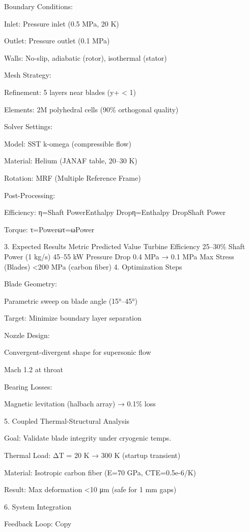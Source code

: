 \documentclass{article}
\begin{document}
Boundary Conditions:

Inlet: Pressure inlet (0.5 MPa, 20 K)

Outlet: Pressure outlet (0.1 MPa)

Walls: No-slip, adiabatic (rotor), isothermal (stator)

Mesh Strategy:

Refinement: 5 layers near blades (y+ \textless{} 1)

Elements: 2M polyhedral cells (90\% orthogonal quality)

Solver Settings:

Model: SST k-omega (compressible flow)

Material: Helium (JANAF table, 20--30 K)

Rotation: MRF (Multiple Reference Frame)

Post-Processing:

Efficiency: η=Shaft PowerEnthalpy Dropη=Enthalpy DropShaft
Power\hspace{0pt}

Torque: τ=Powerωτ=ωPower\hspace{0pt}

3. Expected Results Metric Predicted Value Turbine Efficiency 25--30\%
Shaft Power (1 kg/s) 45--55 kW Pressure Drop 0.4 MPa → 0.1 MPa Max
Stress (Blades) \textless200 MPa (carbon fiber) 4. Optimization Steps

Blade Geometry:

Parametric sweep on blade angle (15°--45°)

Target: Minimize boundary layer separation

Nozzle Design:

Convergent-divergent shape for supersonic flow

Mach 1.2 at throat

Bearing Losses:

Magnetic levitation (halbach array) → 0.1\% loss

5. Coupled Thermal-Structural Analysis

Goal: Validate blade integrity under cryogenic temps.

Thermal Load: ΔT = 20 K → 300 K (startup transient)

Material: Isotropic carbon fiber (E=70 GPa, CTE=0.5e-6/K)

Result: Max deformation \textless10 μm (safe for 1 mm gaps)

6. System Integration

Feedback Loop: Copy
\end{document}

